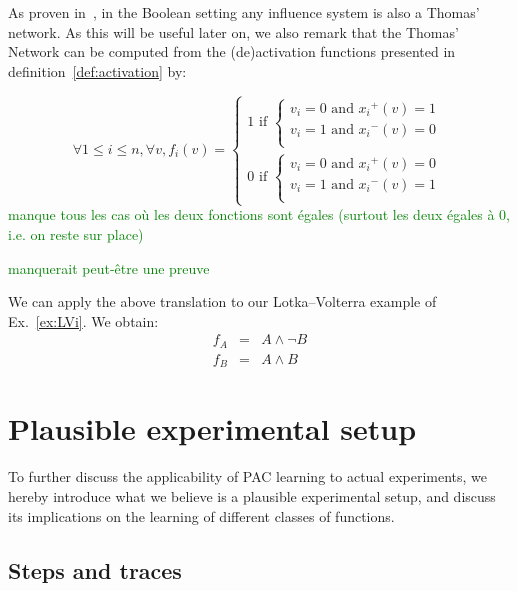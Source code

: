 \documentclass{llncs}
\newcommand{\sylvain}[1]{\textcolor{green}{#1}}
\begin{document}
As proven in~\cite{FMRS16cmsb}, in the Boolean setting any influence system is
also a Thomas' network.
As this will be useful later on, we also remark that the Thomas' Network can be computed from the (de)activation functions presented in definition~\ref{def:activation} by:

\[
\forall 1 \leq i \leq n, \forall v, f_i(v) = \left\{\begin{array}{l}
1 \text{ if } \left\{\begin{array}{l}
v_i = 0 \text{ and } {x_i}^+(v) = 1\\
v_i = 1 \text{ and } {x_i}^-(v) = 0 \\
\end{array}\right.\\[1em]
0 \text{ if } \left\{\begin{array}{l}
v_i = 0 \text{ and } {x_i}^+(v) = 0\\
v_i = 1 \text{ and } {x_i}^-(v) = 1\\
\end{array}\right.
\end{array}\right.
\]
\sylvain{manque tous les cas où les deux fonctions sont égales (surtout les
deux égales à 0, i.e. on reste sur place)}

\sylvain{manquerait peut-être une preuve}


\begin{example}
   We can apply the above translation to our Lotka--Volterra example of
   Ex.~\ref{ex:LVi}. We obtain:
   \begin{eqnarray*}
   f_A &=& A \wedge\neg B\\
   f_B &=& A \wedge B
   \end{eqnarray*}

\end{example}

\section{Plausible experimental setup}

To further discuss the applicability of PAC learning to actual experiments, we hereby introduce what we believe is a plausible experimental setup, and discuss its implications on the learning of different classes of functions.

\subsection{Steps and traces}
\end{document}
